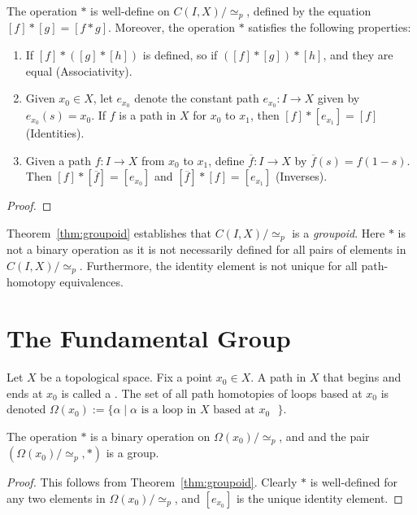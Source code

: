 \begin{theorem}\label{thm:groupoid}
    The operation $\ast$ is well-define on $C(I,X)/\simeq_p$, defined by the equation $[f] \ast [g] = [f \ast g]$. Moreover, the operation $\ast$ satisfies the following properties:
    \begin{enumerate}[label = (\alph*),itemsep=1pt,topsep=3pt]
        \item If $[f] \ast([g] \ast [h])$ is defined, so if $([f] \ast [g]) \ast [h]$, and they are equal (Associativity).
        \item Given $x_0 \in X$, let $e_{x_0}$ denote the constant path $e_{x_0}:I \rightarrow X$ given by $e_{x_0}(s) = x_0$. If $f$ is a path in $X$ for $x_0$ to $x_1$, then $[f] \ast [e_{x_1}] = [f]$ (Identities).
        \item Given a path $f:I \rightarrow X$ from $x_0$ to $x_1$, define $\overline{f}:I \rightarrow X$ by $\overline{f}(s) = f(1-s)$. Then $[f] \ast [\overline{f}] = [e_{x_0}]$ and $[\overline{f}] \ast [f] = [e_{x_1}]$ (Inverses).
    \end{enumerate}
\end{theorem}
    {\color{red} \begin{proof}
        
    \end{proof}}

\begin{remark}
    Theorem~\ref{thm:groupoid} establishes that $C(I,X)/\simeq_p$ is a \textit{groupoid}. Here $\ast$ is not a binary operation as it is not necessarily defined for all pairs of elements in $C(I,X)/\simeq_p$. Furthermore, the identity element is not unique for all path-homotopy equivalences.
\end{remark}

\section{The Fundamental Group}

\begin{definition}
    Let $X$ be a topological space. Fix a point $x_0 \in X$. A path in $X$ that begins and ends at $x_0$ is called a . The set of all path homotopies of loops based at $x_0$ is denoted $\Omega(x_0) := \{\alpha \mid \text{$\alpha$ is a loop in $X$ based at $x_0$ }\}$.
\end{definition}

\begin{theorem}
    The operation $\ast$ is a binary operation on $\Omega(x_0)/\simeq_p$, and and the pair $(\Omega(x_0)/\simeq_p,\ast)$ is a group.
\end{theorem}
    \begin{proof}
        This follows from Theorem~\ref{thm:groupoid}. Clearly $\ast$ is well-defined for any two elements in $\Omega(x_0)/\simeq_p$, and $[e_{x_0}]$ is the unique identity element.
    \end{proof}

